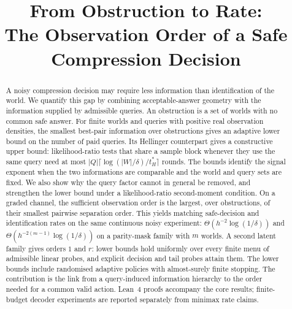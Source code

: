 



\title{From Obstruction to Rate:\\The Observation Order of a Safe Compression Decision}

\author{
}

\maketitle

\begin{abstract}
A noisy compression decision may require less information than identification of the world.
We quantify this gap by combining acceptable-answer geometry with the information supplied
by admissible queries. An obstruction is a set of worlds with no common safe answer.
For finite worlds and queries with positive real observation densities, the smallest
best-pair information over obstructions gives an adaptive lower bound on the number of paid
queries. Its Hellinger counterpart gives a constructive upper bound: likelihood-ratio tests
that share a sample block whenever they use the same query need at most
$|Q|\lceil\log(|W|/\delta)/t_H^*\rceil$ rounds.
The bounds identify the signal exponent when the two informations are comparable and the
world and query sets are fixed. We also show why the query factor cannot in general be
removed, and strengthen the lower bound under a likelihood-ratio second-moment condition.
On a graded channel, the sufficient observation order is the largest, over obstructions, of
their smallest pairwise separation order. This yields matching safe-decision and identification
rates on the same continuous noisy experiment: $\Theta(h^{-2}\log(1/\delta))$ and
$\Theta(h^{-2(m-1)}\log(1/\delta))$ on a parity-mask family with $m$ worlds.
A second latent family gives orders $1$ and $r$: lower bounds hold uniformly over every
finite menu of admissible linear probes, and explicit decision and tail probes attain them.
The lower bounds include randomised adaptive policies with almost-surely finite stopping.
The contribution is the link from a query-induced information hierarchy to the order needed
for a common valid action. Lean~4 proofs accompany the core results; finite-budget decoder
experiments are reported separately from minimax rate claims.
\end{abstract}

